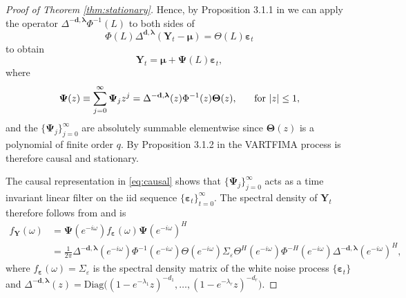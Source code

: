 \documentclass[11pt,english,oneside]{amsart}
\numberwithin{equation}{section}
\theoremstyle{plain}
\numberwithin{equation}{section}
\renewcommand{\v}[1]{\boldsymbol{#1}}
\begin{document}
\begin{proof}[Proof of Theorem \ref{thm:stationary}]
    Hence, by Proposition 3.1.1 in \cite{brockwell1991time} we can apply the operator $\Delta^{\mathbf{-d},\v \lambda}\Phi^{-1}(L)$ to both sides of
    \begin{equation}
        \Phi(L)\Delta^{\mathbf{d},\v \lambda}(\mathbf{Y}_{t}-\v \mu)=\Theta(L) \v \varepsilon_{t}
    \end{equation}
    to obtain
    \begin{equation}\label{eq:causal}
        \mathbf{Y}_{t} = \v \mu +  \v\Psi(L)\v \varepsilon_{t},
    \end{equation}
    where 
    \begin{equation*}
        \v\Psi(z)\equiv \sum_{j=0}^\infty \v\Psi_j z^j = \Delta^{\mathbf{-d},\v \lambda}(z)\Phi^{-1}(z)\v\Theta(z),\hspace{0.5cm}\text{ for } |z|\leq 1,
    \end{equation*}
    and the $\{ \v\Psi_j\}_{j=0}^\infty$ are absolutely summable elementwise since $\v \Theta(z)$ is a polynomial of finite order $q$. By Proposition 3.1.2 in \cite{brockwell1991time} the VARTFIMA process is therefore causal and stationary.

    The causal representation in \eqref{eq:causal} shows that $\{ \v\Psi_j\}_{j=0}^\infty$ acts as a time invariant linear filter on the iid sequence $\{ \v\varepsilon_t\}_{t=0}^\infty$. The spectral density of $\mathbf{Y}_{t}$ therefore follows from \citet[Theorem 11.8.3]{brockwell1991time} and is
    \begin{align*}
        f_{\mathbf{Y}}(\omega) &=  \v\Psi(e^{-i\omega})f_{\v \varepsilon}(\omega) \v\Psi(e^{-i\omega})^H \\
        &=\frac{1}{2\pi} \Delta^{\mathbf{-d},\v \lambda}(e^{-i\omega}) \Phi^{-1}(e^{-i\omega})\Theta(e^{-i\omega}) \Sigma_{\varepsilon} \Theta^H(e^{-i\omega})  \Phi^{-H}(e^{-i\omega})  \Delta^{\mathbf{-d},\v \lambda}(e^{-i\omega})^H,
    \end{align*}
    where $f_{\v \varepsilon}(\omega)=\Sigma_{\varepsilon}$ is the spectral density matrix of the white noise process $\{ \v\varepsilon_t\}$ and $\Delta^{\mathbf{-d},\v \lambda}(z) = \mathrm{Diag}\big((1-e^{-\lambda_1}z)^{-d_1},\ldots,(1-e^{-\lambda_r }z)^{-d_r}\big).$
\end{proof}
\end{document}
